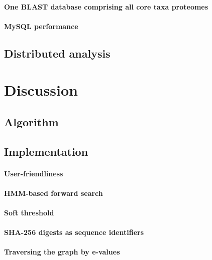 \documentclass[a4paper,12pt]{scrreprt}
\begin{document}
			\subsubsection{One BLAST database comprising all core taxa proteomes}
				
			\subsubsection{MySQL performance}
				
	\section{Distributed analysis}
		

\chapter{Discussion}
	
	\section{Algorithm}
		
	\section{Implementation}
		
		\subsubsection{User-friendliness}
			
		\subsubsection{HMM-based forward search}
			
		\subsubsection{Soft threshold}
			
		\subsubsection{SHA-256 digests as sequence identifiers}
			
		\subsubsection{Traversing the graph by e-values}
			
\end{document}
